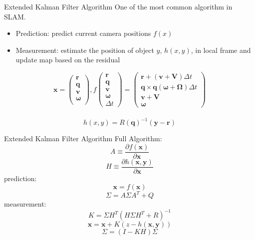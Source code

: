 \documentclass{beamer}
\begin{document}
	\begin{frame}{Extended Kalman Filter Algorithm}
		One of the most common algorithm in SLAM.
		\uncover<2->
		{
			\begin{itemize}
				\item Prediction: predict current camera positions \alert{$f(x)$}
				\item Measurement: estimate the position of object $y$, \alert{$h(x,y)$}, in local frame and update map based on the residual
			\end{itemize}
		}
		{
			\[
			\mathbf{x} = \left( 
			\begin{array}{c} 
				\mathbf{r}\\
				\mathbf{q}\\
				\mathbf{v}\\
				\mathbf{\omega}\\
			\end{array}
			\right),  
			f\left( 
			\begin{array}{c} 
				\mathbf{r}\\
				\mathbf{q}\\
				\mathbf{v}\\
				\mathbf{\omega}\\
				\Delta t
			\end{array} 
			\right) = 
			\left( 
			\begin{array}{c}
				\mathbf{r} + (\mathbf{v}+\mathbf{V})\Delta t\\
				\mathbf{q} \times \mathbf{q}(\mathbf{\omega}+\mathbf{\Omega})\Delta t\\
				\mathbf{v} + \mathbf{V}\\
				\mathbf{\omega} 
			\end{array} 
			\right)
			\] \\

			\[ h(x,y) = R(\mathbf{q})^{-1}( \mathbf{y}-\mathbf{r} ) \]
		}
	\end{frame}

	\begin{frame}{Extended Kalman Filter Algorithm}
		Full Algorithm: \\
		\[ A \equiv \frac{ \partial f(\mathbf{x}) }{ \partial \mathbf{x} } \]
		\[ H \equiv \frac{ \partial h(\mathbf{x},\mathbf{y}) }{ \partial \mathbf{x} } \]
		prediction:\\
		\[\mathbf{x} = f(\mathbf{x})\]
		\[\Sigma = A\Sigma A^{T} + Q\]
		measurement:\\
		\[K = \Sigma H^{T}(H\Sigma H^{T}+R)^{-1}\]
		\[\mathbf{x} = \mathbf{x}+K(z-h(\mathbf{x},\mathbf{y}))\]
		\[\Sigma = (I-KH)\Sigma\]


	\end{frame}
\end{document}
